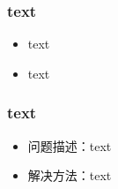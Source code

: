 \subsubsection{text}
\begin{itemize}
    \item text
    \item text
\end{itemize}



\subsubsection{text}
\begin{itemize}
    \item 问题描述：text
    \item 解决方法：text
\end{itemize}
